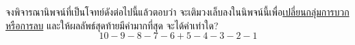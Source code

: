 \question{}

จงพิจารณานิพจน์ที่เป็นโจทย์ดังต่อไปนี้แล้วตอบว่า จะเติมวงเล็บลงในนิพจน์นี้เพื่อ\uline{เปลี่ยนกลุ่มการบวกหรือการลบ}
และให้ผลลัพธ์สุดท้ายมีค่ามากที่สุด จะได้ค่าเท่าใด?
\[
    \mathrm{10 - 9 - 8 - 7 - 6 + 5 - 4 - 3 - 2 - 1} 
\]
